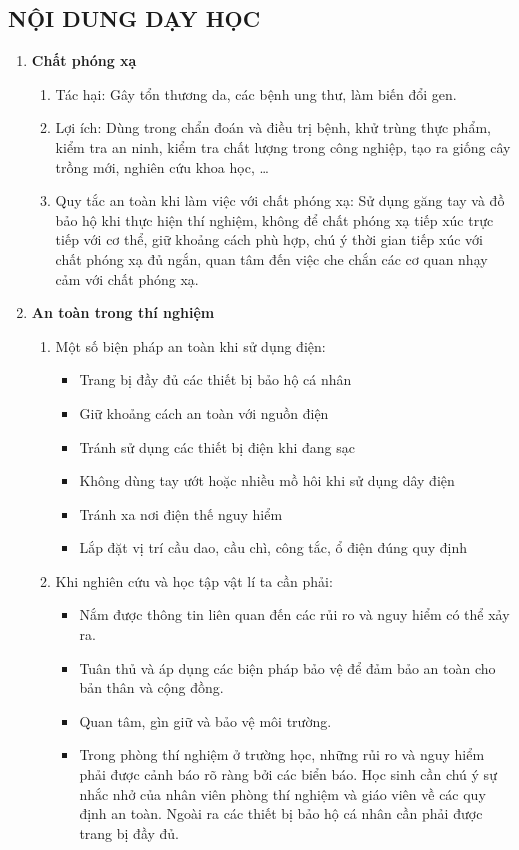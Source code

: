 \subsection{NỘI DUNG DẠY HỌC}
\begin{enumerate}[label=\bfseries \arabic*.]
	\item \textbf{Chất phóng xạ}
	\begin{enumerate}[label=\alph*/]
		\item Tác hại: Gây tổn thương da, các bệnh ung thư, làm biến đổi gen.
		\item Lợi ích: Dùng trong chẩn đoán và điều trị bệnh, khử trùng thực phẩm, kiểm tra an ninh, kiểm tra chất lượng trong công nghiệp, tạo ra giống cây trồng mới, nghiên cứu khoa học, \dots
		\item Quy tắc an toàn khi làm việc với chất phóng xạ: Sử dụng găng tay và đồ bảo hộ khi thực hiện thí nghiệm, không để chất phóng xạ tiếp xúc trực tiếp với cơ thể, giữ khoảng cách phù hợp, chú ý thời gian tiếp xúc với chất phóng xạ đủ ngắn, quan tâm đến việc che chắn các cơ quan nhạy cảm với chất phóng xạ.
	\end{enumerate}
\item \textbf{An toàn trong thí nghiệm}
\begin{enumerate}[label=\alph*/]
	\item Một số biện pháp an toàn khi sử dụng điện:
	\begin{itemize}
		\item Trang bị đầy đủ các thiết bị bảo hộ cá nhân
		\item Giữ khoảng cách an toàn với nguồn điện
		\item Tránh sử dụng các thiết bị điện khi đang sạc
		\item Không dùng tay ướt hoặc nhiều mồ hôi khi sử dụng dây điện
		\item Tránh xa nơi điện thế nguy hiểm
		\item Lắp đặt vị trí cầu dao, cầu chì, công tắc, ổ điện đúng quy định
	\end{itemize}
\item Khi nghiên cứu và học tập vật lí ta cần phải:
\begin{itemize}
	\item Nắm được thông tin liên quan đến các rủi ro và nguy hiểm có thể xảy ra.
	\item Tuân thủ và áp dụng các biện pháp bảo vệ để đảm bảo an toàn cho bản thân và cộng đồng.
	\item Quan tâm, gìn giữ và bảo vệ môi trường.
	\item Trong phòng thí nghiệm ở trường học, những rủi ro và nguy hiểm phải được cảnh báo rõ ràng bởi các biển báo. Học sinh cần chú ý sự nhắc nhở của nhân viên phòng thí nghiệm và giáo viên về các quy định an toàn. Ngoài ra các thiết bị bảo hộ cá nhân cần phải được trang bị đầy đủ.
\end{itemize}
\end{enumerate}
\end{enumerate}
